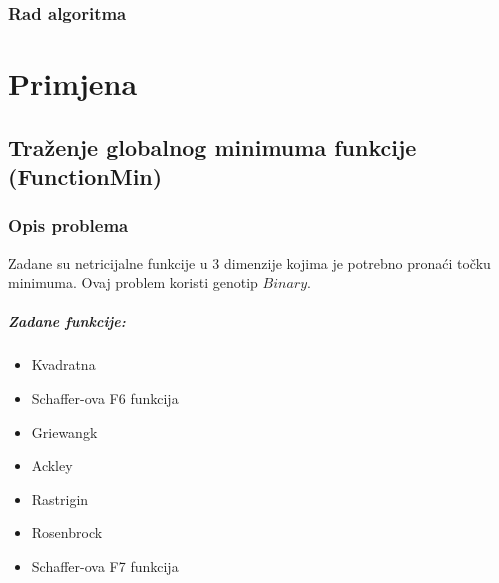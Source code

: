 \documentclass[times, utf8, zavrsni]{fer}
\begin{document}
\subsection{Rad algoritma}



\chapter{Primjena}

\section{Traženje globalnog minimuma funkcije (FunctionMin)}
\subsection{Opis problema}
Zadane su netricijalne funkcije u 3 dimenzije kojima je potrebno pronaći točku minimuma.
Ovaj problem koristi genotip $Binary$.

\paragraph{Zadane funkcije:}
\begin{itemize}
\item Kvadratna
\item Schaffer-ova F6 funkcija
\item Griewangk
\item Ackley
\item Rastrigin
\item Rosenbrock
\item Schaffer-ova F7 funkcija
\end{itemize}
\end{document}
